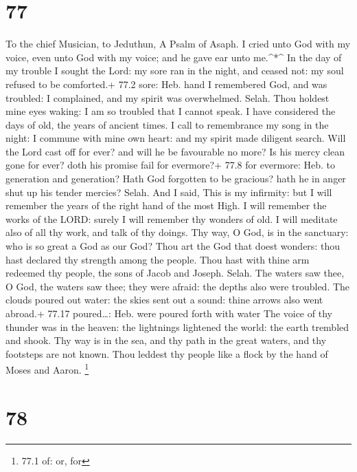 \hypertarget{section-76}{%
\section{77}\label{section-76}}

To the chief Musician, to Jeduthun, A Psalm of Asaph.  I
cried unto God with my voice, even unto God with my voice; and he gave
ear unto me.\^{}*\^{}  In the day of my trouble I sought the
Lord: my sore ran in the night, and ceased not: my soul refused to be
comforted.+ 77.2 sore: Heb. hand  I remembered God, and was
troubled: I complained, and my spirit was overwhelmed. Selah.
 Thou holdest mine eyes waking: I am so troubled that I
cannot speak.  I have considered the days of old, the years
of ancient times.  I call to remembrance my song in the
night: I commune with mine own heart: and my spirit made diligent
search.  Will the Lord cast off for ever? and will he be
favourable no more?  Is his mercy clean gone for ever? doth
his promise fail for evermore?+ 77.8 for evermore: Heb. to generation
and generation?  Hath God forgotten to be gracious? hath he
in anger shut up his tender mercies? Selah.  And I said,
This is my infirmity: but I will remember the years of the right hand of
the most High.  I will remember the works of the LORD:
surely I will remember thy wonders of old.  I will meditate
also of all thy work, and talk of thy doings.  Thy way, O
God, is in the sanctuary: who is so great a God as our God?
 Thou art the God that doest wonders: thou hast declared
thy strength among the people.  Thou hast with thine arm
redeemed thy people, the sons of Jacob and Joseph. Selah. 
The waters saw thee, O God, the waters saw thee; they were afraid: the
depths also were troubled.  The clouds poured out water:
the skies sent out a sound: thine arrows also went abroad.+ 77.17
poured\ldots: Heb. were poured forth with water  The voice
of thy thunder was in the heaven: the lightnings lightened the world:
the earth trembled and shook.  Thy way is in the sea, and
thy path in the great waters, and thy footsteps are not known.
 Thou leddest thy people like a flock by the hand of Moses
and Aaron. \footnote{77.1 of: or, for}

\hypertarget{section-77}{%
\section{78}\label{section-77}}

